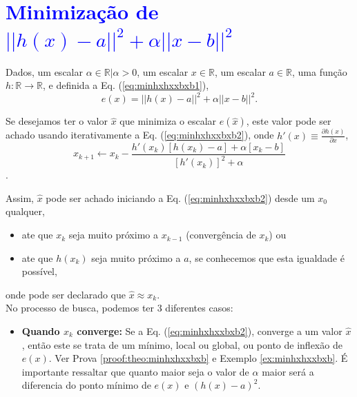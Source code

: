 
~\\
~\\
\section{\textcolor{blue}{Minimização de $||h(x)-a||^2+\alpha ||x-b||^2$}}

\begin{theorem}\label{theo:minhxhxxbxb}
Dados,
um escalar $\alpha \in \mathbb{R} | \alpha > 0$, 
um escalar $x \in \mathbb{R}$, 
um escalar $a \in \mathbb{R}$,  
uma função $h:\mathbb{R} \rightarrow \mathbb{R}$, e 
definida a Eq. (\ref{eq:minhxhxxbxb1}),
\begin{equation}\label{eq:minhxhxxbxb1}
e(x)=||h(x)-a||^2+\alpha ||x-b||^2.
\end{equation}

Se desejamos ter o valor $\hat{x}$ que minimiza o escalar $e(\hat{x})$,
este valor pode ser achado usando iterativamente a Eq. (\ref{eq:minhxhxxbxb2}),
onde  $h'(x)\equiv \frac{\partial h(x)}{\partial x}$,
\begin{equation}\label{eq:minhxhxxbxb2}
x_{k+1} \leftarrow x_k-
\frac{ h'(x_k) \left[h(x_k)-a\right]+\alpha\left[ x_k-b\right]}{\left[h'(x_k)\right]^2+\alpha}
\end{equation}.

Assim, $\hat{x}$ pode ser achado iniciando a Eq. (\ref{eq:minhxhxxbxb2}) desde um 
$x_{0}$ qualquer, 
\begin{itemize}
    \item ate que $x_{k}$ seja muito próximo a $x_{k-1}$ (convergência de $x_{k}$) ou
    \item ate que $h(x_{k})$ seja muito próximo a $a$, 
    se conhecemos que esta igualdade é possível,
\end{itemize}
onde pode ser declarado que $\hat{x} \approx x_{k}$.\\

No processo de busca, podemos ter 3 diferentes casos:
\begin{itemize}
\item \textbf{Quando $x_{k}$ converge:}  
Se a Eq. (\ref{eq:minhxhxxbxb2}),  converge a um valor $\hat{x}$, então este se trata de 
um mínimo, local ou global, ou ponto de inflexão de $e(x)$. 
Ver Prova \ref{proof:theo:minhxhxxbxb} e Exemplo \ref{ex:minhxhxxbxb}.
\'E importante ressaltar que quanto maior seja o valor de $\alpha$ maior
será a diferencia do ponto mínimo de $e(x)$ e $(h(x)-a)^2$.



\end{itemize}
\end{theorem}
